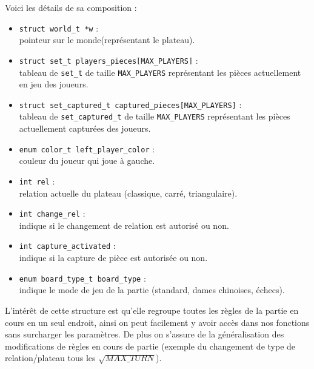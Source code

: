 \documentclass{article}
\begin{document}
Voici les détails de sa composition :
\begin{itemize}
    \item \lstinline{struct world_t *w} :
    \\ pointeur sur le monde(représentant le plateau).
    \item \lstinline{struct set_t players_pieces[MAX_PLAYERS]} :
    \\ tableau de \lstinline{set_t} de taille \lstinline{MAX_PLAYERS} représentant les pièces actuellement
    en jeu des joueurs.
    \item \lstinline{struct set_captured_t captured_pieces[MAX_PLAYERS]} :
    \\ tableau de \lstinline{set_captured_t} de taille \lstinline{MAX_PLAYERS} représentant les pièces actuellement
    capturées des joueurs.
    \item \lstinline{enum color_t left_player_color} :
    \\ couleur du joueur qui joue à gauche.
    \item \lstinline{int rel} :
    \\ relation actuelle du plateau (classique, carré, triangulaire).
    \item \lstinline{int change_rel} :
    \\ indique si le changement de relation est autorisé ou non.
    \item \lstinline{int capture_activated} :
    \\ indique si la capture de pièce est autorisée ou non.
    \item \lstinline{enum board_type_t board_type} :
    \\ indique le mode de jeu de la partie (standard, dames chinoises, échecs).
\end{itemize}
\vspace{1cm}
L'intérêt de cette structure est qu'elle regroupe toutes les règles de la partie en cours en un seul endroit, ainsi on peut
facilement y avoir accès dans nos fonctions sans surcharger les paramètres. De plus on s'assure de la généralisation des modifications de règles en cours de partie (exemple du changement de type de relation/plateau tous les  $\sqrt{MAX\_TURN}$).
\end{document}
